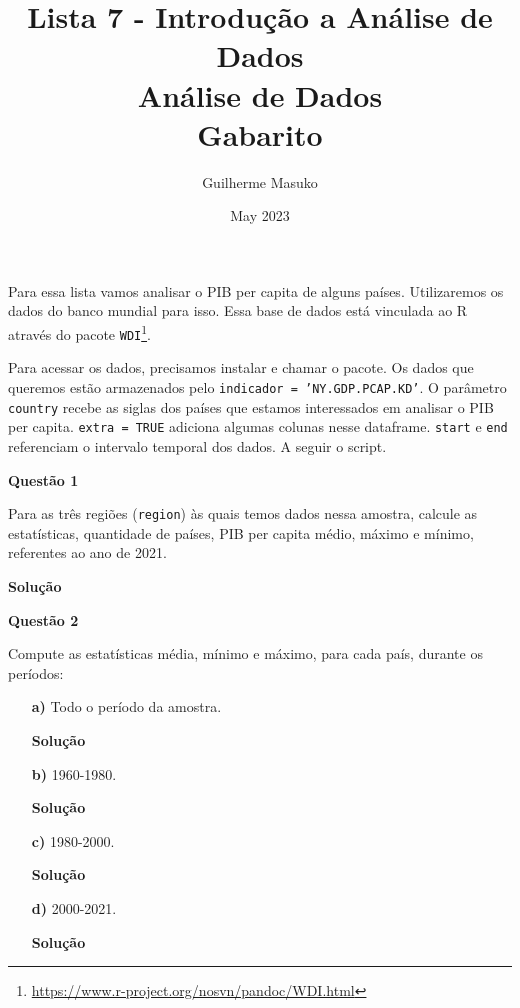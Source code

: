 \documentclass[12pt, a4paper]{article}
\title{Lista 7 - Introdução a Análise de Dados \\
	Análise de Dados \\
	Gabarito}
\author{Guilherme Masuko}
\date{May 2023}
\begin{document}
	
\clearpage
\maketitle
\thispagestyle{empty}


Para essa lista vamos analisar o PIB per capita de alguns países. Utilizaremos os dados do banco mundial para isso. Essa base de dados está vinculada ao R através do pacote \texttt{WDI}\footnote{\url{https://www.r-project.org/nosvn/pandoc/WDI.html}}.

Para acessar os dados, precisamos instalar e chamar o pacote. Os dados que queremos estão armazenados pelo \texttt{indicador = 'NY.GDP.PCAP.KD'}. O parâmetro \texttt{country} recebe as siglas dos países que estamos interessados em analisar o PIB per capita. \texttt{extra = TRUE} adiciona algumas colunas nesse dataframe. \texttt{start} e \texttt{end} referenciam o intervalo temporal dos dados. A seguir o script.





\textbf{Questão 1}

Para as três regiões (\texttt{region}) às quais temos dados nessa amostra, calcule as estatísticas, quantidade de países, PIB per capita médio, máximo e mínimo, referentes ao ano de 2021.



\textbf{Solução}






\textbf{Questão 2}

Compute as estatísticas média, mínimo e máximo, para cada país, durante os períodos:

\begin{itemize}
	\item[\textbf{a)}] Todo o período da amostra.
	
	
	\textbf{Solução}
	
	
	
	
	
	\item[\textbf{b)}] 1960-1980.
	
	
	\textbf{Solução}
	
	
	
	
	
	\item[\textbf{c)}] 1980-2000.
	
	
	\textbf{Solução}
	
	
	
	
	
	\item[\textbf{d)}] 2000-2021.
	
	
	\textbf{Solução}
	
	
	
	
	
\end{itemize}
\end{document}
